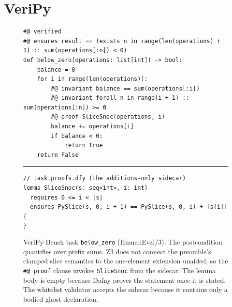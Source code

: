 \documentclass{article}
\newcommand{\toolname}{VeriPy}
\newcommand{\benchname}{VeriPy-Bench}
\begin{document}
\section{\toolname{}}
\label{sec:apparatus}

\begin{figure}[t]
\begin{scriptsize}
\begin{verbatim}
#@ verified
#@ ensures result == (exists n in range(len(operations) + 1) :: sum(operations[:n]) < 0)
def below_zero(operations: list[int]) -> bool:
    balance = 0
    for i in range(len(operations)):
        #@ invariant balance == sum(operations[:i])
        #@ invariant forall n in range(i + 1) :: sum(operations[:n]) >= 0
        #@ proof SliceSnoc(operations, i)
        balance += operations[i]
        if balance < 0:
            return True
    return False
\end{verbatim}
\hrule
\begin{verbatim}
// task.proofs.dfy (the additions-only sidecar)
lemma SliceSnoc(s: seq<int>, i: int)
  requires 0 <= i < |s|
  ensures PySlice(s, 0, i + 1) == PySlice(s, 0, i) + [s[i]]
{
}
\end{verbatim}
\end{scriptsize}
\caption{\benchname{} task \texttt{below\_zero} (HumanEval/3). The
postcondition quantifies over prefix sums. Z3 does not connect the
preamble's clamped slice semantics to the one-element extension unaided,
so the \texttt{\#@ proof} clause invokes \texttt{SliceSnoc} from the
sidecar. The lemma body is empty because Dafny proves the statement once
it is stated. The whitelist validator accepts the sidecar because it
contains only a bodied ghost declaration.}
\label{fig:example}
\end{figure}
\end{document}
